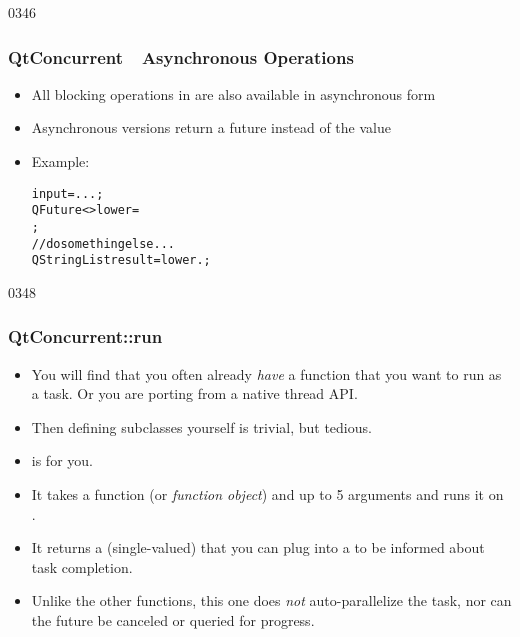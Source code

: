 \begin{slide}[fragile]{0346}
\frametitle{QtConcurrent~\textemdash~Asynchronous Operations}
  \begin{itemize}
  \item All blocking operations in  are also available in asynchronous form
  \item Asynchronous versions return a future instead of the value
  \item Example:%
    \begin{alltt}
 input = ...;
QFuture<> lower =
  ;
// do something else...
QStringList result = lower.;
    \end{alltt}
  \end{itemize}
\end{slide}
\begin{slide}{0348}
\frametitle{QtConcurrent::run}
  \begin{itemize}
  \item You will find that you often already \emph{have} a function
    that you want to run as a task. Or you are porting from a native thread
    API.
  \item Then defining  subclasses yourself is trivial,
    but tedious.
  \item {} is for you.
  \item It takes a function (or \emph{function object}) and up to 5
    arguments and runs it on .
  \item It returns a (single-valued)  that you can plug
    into a  to be informed about task completion.
  \item \pleaseNote Unlike the other  functions,
    this one does \emph{not} auto-parallelize the task, nor can the
    future be canceled or queried for progress.
  \end{itemize}
\end{slide}
